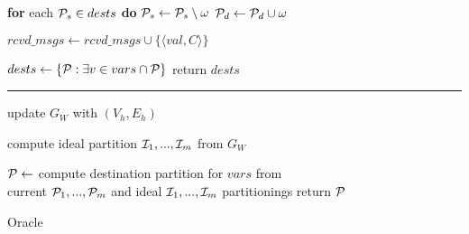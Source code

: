 \begin{algorithm}[t!]
\begin{distribalgo}[1]
	\vspace{1.0mm}
    \STATE \textbf{for} each $\mathcal{P}_s \in dests$ \textbf{do} $\mathcal{P}_s \leftarrow \mathcal{P}_s \setminus \omega$
    \STATE $\mathcal{P}_d \leftarrow \mathcal{P}_d \cup \omega$
	\ENDINDENT

  \vspace{1.0mm}
    
		\STATE $rcvd\_msgs \leftarrow rcvd\_msgs \cup \{\langle val, C \rangle\}$
	\ENDINDENT
	
	\vspace{1.0mm}
		\STATE $dests \leftarrow \{ \mathcal{P} : \exists v \in vars \cap \mathcal{P} \}$
		\STATE return $dests$
	\ENDINDENT
	
	\rule{83mm}{0.4pt}

		\STATE update $G_W$ with $(V_h,E_h)$
	\ENDINDENT
	
	\vspace{1.0mm}
    
		\STATE compute ideal partition $\mathcal{I}_1, ..., \mathcal{I}_m$ from $G_W$
	\ENDINDENT
	
	\vspace{1.0mm}
    
		\STATE $\mathcal{P} \leftarrow$ compute destination partition for $vars$ from\\ \hspace{8mm}current $\mathcal{P}_1, ..., \mathcal{P}_m$ and ideal $\mathcal{I}_1, ..., \mathcal{I}_m$ partitionings
		\STATE return $\mathcal{P}$
	\ENDINDENT	
	
%        


\caption{Oracle}
\label{alg:oracle_proxy}
\end{distribalgo}
\end{algorithm}
